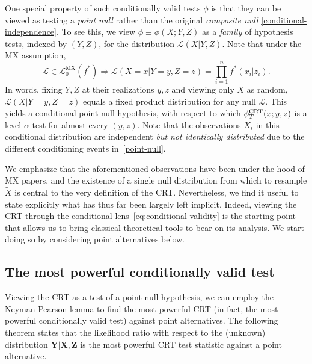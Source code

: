 \documentclass[ejs]{imsart}
\numberwithin{equation}{section}
\theoremstyle{plain}
\theoremstyle{definition}
\theoremstyle{remark}
\newcommand{\prx}{\bm X}
\newcommand{\srx}{X}
\newcommand{\sfx}{x}
\newcommand{\prz}{\bm Z}
\newcommand{\srz}{Z}
\newcommand{\sfz}{z}
\newcommand{\srxk}{\widetilde X}
\newcommand{\pry}{{\bm Y}}
\newcommand{\sry}{Y}
\newcommand{\sfy}{y}
\def\CRT{\textnormal{CRT}}
\begin{document}
One special property of such conditionally valid tests $\phi$ is that they can be viewed as testing a \textit{point null} rather than the original \textit{composite null} \eqref{conditional-independence}. To see this, we view $\phi \equiv \phi(\srx;\sry,\srz)$ as a \textit{family} of hypothesis tests, indexed by $(\sry, \srz)$, for the distribution $\mathcal L(\srx|\sry,\srz)$. Note that under the MX assumption,
\small
\begin{equation}
\mathcal L \in \mathscr L_0^{\text{MX}}(f^*) \Longrightarrow \mathcal L(\srx = \sfx|\sry = \sfy, \srz = \sfz) = \prod_{i = 1}^n  f^*(\sfx_i | \sfz_i).
\label{point-null}
\end{equation}
\normalsize
In words, fixing $Y,Z$ at their realizations $\sfy,\sfz$ and viewing only $\srx$ as random, $\mathcal L(\srx|\sry = \sfy, \srz = \sfz)$ equals a fixed product distribution for any null $\mathcal L$. This yields a conditional point null hypothesis, with respect to which $\phi^{\CRT}_T(\sfx;\sfy,\sfz)$ is a level-$\alpha$ test for almost every $(\sfy, \sfz)$. Note that the observations $\srx_i$ in this conditional distribution are independent \textit{but not identically distributed} due to the different conditioning events in~\eqref{point-null}.

We emphasize that the aforementioned observations have been under the hood of MX papers, and the existence of a single null distribution from which to resample $\srxk$ is central to the very definition of the CRT. Nevertheless, we find it useful to state explicitly what has thus far been largely left implicit. Indeed, viewing the CRT through the conditional lens~\eqref{eq:conditional-validity} is the starting point that allows us to bring classical theoretical tools to bear on its analysis. We start doing so by considering point alternatives below.

\subsection{The most powerful conditionally valid test} \label{sec:NP}

Viewing the CRT as a test of a point null hypothesis, we can employ the  Neyman-Pearson lemma to find the most powerful CRT (in fact, the most powerful conditionally valid test) against point alternatives. The following theorem states that the likelihood ratio with respect to the (unknown) distribution $\pry|\prx, \prz$ is the most powerful CRT test statistic against a point alternative.
\end{document}
